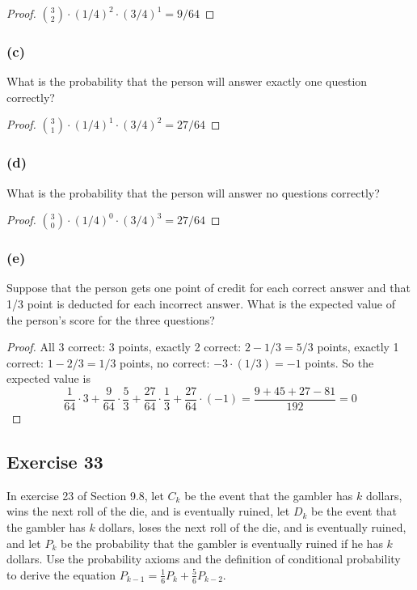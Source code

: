 \documentclass[14pt]{extarticle}
\newcommand{\dps}{\displaystyle}
\begin{document}
\begin{proof}
     \(\binom{3}{2} \cdot (1/4)^2 \cdot (3/4)^1 = 9/64\)
\end{proof}

\subsubsection{(c)}
What is the probability that the person will answer exactly one question correctly?

\begin{proof}
     \(\binom{3}{1} \cdot (1/4)^1 \cdot (3/4)^2 = 27/64\)
\end{proof}

\subsubsection{(d)}
What is the probability that the person will answer no questions correctly?

\begin{proof}
     \(\dps \binom{3}{0} \cdot (1/4)^0 \cdot (3/4)^3 = 27/64\)
\end{proof}

\subsubsection{(e)}
Suppose that the person gets one point of credit for each correct answer and that 1/3 point is deducted for each
incorrect answer. What is the expected value of the person’s score for the three questions?

\begin{proof}
     All 3 correct: 3 points, exactly 2 correct: \(2-1/3 = 5/3\) points, exactly 1 correct: \(1 - 2/3 = 1/3\) points, no
     correct: \(-3 \cdot (1/3) = -1\) points. So the expected value is
     \[
          \frac{1}{64} \cdot 3 + \frac{9}{64} \cdot \frac{5}{3} + \frac{27}{64} \cdot \frac{1}{3} + \frac{27}{64} \cdot (-1) =
          \frac{9 + 45 + 27 - 81}{192} = 0
     \]
\end{proof}

\subsection{Exercise 33}
In exercise 23 of Section 9.8, let \(C_k\) be the event that the gambler has \(k\) dollars, wins the next roll of the die,
and is eventually ruined, let \(D_k\) be the event that the gambler has \(k\) dollars, loses the next roll of the die, and
is eventually ruined, and let \(P_k\) be the probability that the gambler is eventually ruined if he has \(k\) dollars. Use
the probability axioms and the definition of conditional probability to derive the equation
\(P_{k-1} = \frac{1}{6}P_k + \frac{5}{6}P_{k-2}\).
\end{document}

